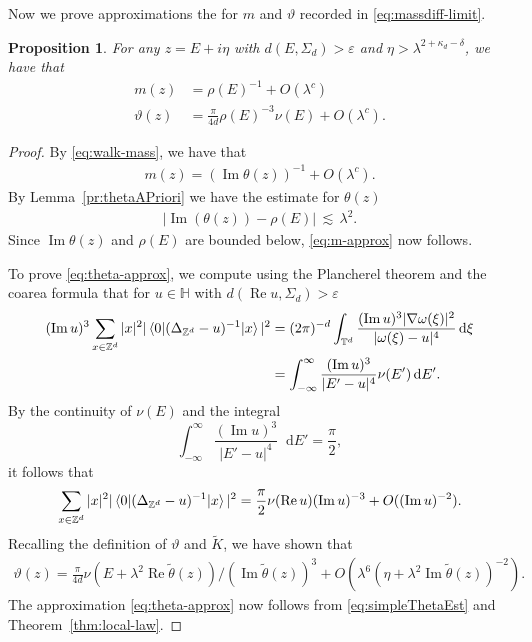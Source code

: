 \documentclass[11pt]{amsart}
\def\bbH{{\mathbb H}}
\def\bbZ{{\mathbb Z}}
\def\Torus{{\mathbb T}}
\def\eps{{\varepsilon}}
\newcommand{\diff}{\mathop{}\!\mathrm{d}}
\newcommand{\Impt}{\operatorname*{Im}}
\newcommand{\Rept}{\operatorname*{Re}}
\def\lsim{{\,\lesssim\,}}
\def\braket#1{\mathinner{\langle{#1}\rangle}}
\numberwithin{equation}{section}
\numberwithin{theorem}{section}
\newtheorem{proposition}[theorem]{Proposition}
\begin{document}
Now we prove approximations the for $m$ and $\vartheta$ recorded in \eqref{eq:massdiff-limit}.
\begin{proposition}
\label{pr:massThetaApprox}
For any $z=E+i\eta$ with $d(E,\Sigma_d)>\eps$ and $\eta>\lambda^{2+\kappa_d-\delta}$, we have that
\begin{align}
m(z)&=\rho(E)^{-1}+O(\lambda^{c})\label{eq:m-approx}\\
\vartheta(z)&=\frac{\pi}{4d}\rho(E)^{-3}\nu(E)+O(\lambda^{c})\label{eq:theta-approx}.
\end{align}
\end{proposition}
\begin{proof}
By \eqref{eq:walk-mass}, we have that
\begin{align*}
	m(z)=(\Impt \theta(z))^{-1}+O(\lambda^{c}).
\end{align*}
By Lemma~\ref{pr:thetaAPriori} we have the estimate for $\theta(z)$
\begin{align}\label{eq:simpleThetaEst}
|\Impt(\theta(z))-  \rho(E)| \lsim \lambda^2.
\end{align}
Since $\Impt \theta(z)$ and  $\rho(E)$ are bounded below, \eqref{eq:m-approx} now follows.

To prove \eqref{eq:theta-approx}, we compute using the Plancherel theorem and the coarea formula that for $u\in \bbH$ with $d(\Rept u,\Sigma_d)>\eps$
\begin{align*}
(\Impt u)^{3}\sum_{x\in\bbZ^d} |x|^2 |\braket{0|(\Delta_{\bbZ^{d}}-u)^{-1}|x}|^{2}
&= (2\pi)^{-d} \int_{\Torus^d} \frac{(\Impt u)^{3}|\nabla \omega(\xi)|^2}{|\omega(\xi) - u|^4} \diff \xi \\
&= \int_{-\infty}^{\infty} \frac{(\Impt u)^3}{|E'-u|^4}  \nu(E') \diff E'.
\end{align*}
By the continuity of $\nu(E)$ and the integral
\[
\int_{-\infty}^\infty \frac{(\Impt u)^3}{|E'-u|^4} \diff E' = \frac{\pi}{2},
\]
it follows that
\begin{align*}
\sum_{x\in\bbZ^d} |x|^2 |\braket{0|(\Delta_{\bbZ^{d}}-u)^{-1}|x}|^{2}=\frac{\pi}{2}\nu(\Rept u)(\Impt u)^{-3}+O((\Impt u)^{-2}).
\end{align*}
Recalling the definition of $\vartheta$ and $\tilde{K}$, we have shown that
\begin{align*}
	\vartheta(z)=\frac{\pi}{4d}\nu(E+\lambda^{2}\Rept \tilde{\theta}(z))/(\Impt \tilde{\theta}(z))^{3}+O(\lambda^{6}(\eta+\lambda^{2}\Impt \tilde{\theta}(z))^{-2}).
\end{align*}
The approximation \eqref{eq:theta-approx} now follows from \eqref{eq:simpleThetaEst} and Theorem~\ref{thm:local-law}.
\end{proof}
\end{document}
